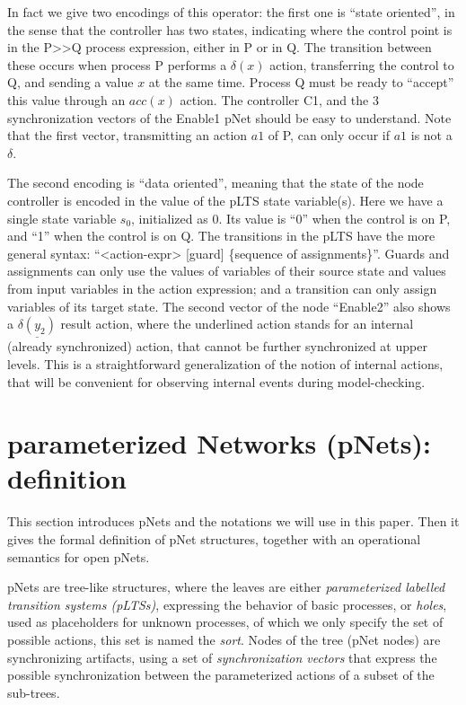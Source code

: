 \documentclass{lncs/llncs}
\newcommand{\ERIC}[1]{\textcolor{blue}{#1}}
\begin{document}
In fact we give two encodings of this operator: the first one is
``state oriented'', in the sense that the controller has two states,
indicating where the control point is in the P>>Q process expression,
either in P or in Q. The transition between these occurs when process
P performs a $\delta(x)$ action, transferring the control to Q, and
sending a value $x$ at the same time. Process Q must be ready to
``accept'' this value through an $acc(x)$ action. The controller C1,
and the 3 synchronization vectors of the Enable1 pNet should be easy
to understand. Note 
that the first vector, transmitting an action $a1$ of P, can only
occur if $a1$ is not a $\delta$.

The second encoding is ``data oriented'', meaning that the state of
the node controller is encoded in the value of the pLTS state
variable(s). Here we have a single state variable $s_0$, initialized
as $0$. Its value is ``0'' when the control is on P, and ``1'' when the
control is on Q. The transitions in the pLTS have the more general
syntax: ``<action-expr> [guard] \{sequence of assignments\}''. Guards
and assignments can only use the values of variables of their source
state and values from input variables in the action expression; and a
transition can only assign variables of its target state. 
The second vector of the node ``Enable2'' also shows a
$\underline{\delta(y_2)}$ result action, where the underlined action
stands for an internal (already synchronized) action, that cannot be
further synchronized at upper levels. This is a straightforward
 generalization of the notion of internal actions, that will be
convenient for observing internal events during model-checking. 



\section{parameterized Networks (pNets): definition}
\label{section:pnets}


This section introduces pNets and the notations we will use in
this paper. Then it gives the formal definition of pNet structures,
together with an operational semantics for open pNets.

pNets are tree-like structures, where the leaves are either
\emph{parameterized labelled transition systems (pLTSs)}, expressing the
behavior of basic processes, or \emph{holes}, used as placeholders
for unknown processes, of which we only specify the set of possible
actions, this set is named the \emph{sort}.
Nodes of the tree (pNet nodes) are synchronizing artifacts, using a
set of \emph{synchronization vectors} that express the possible
synchronization between the parameterized actions of a subset of the
sub-trees.
\end{document}
